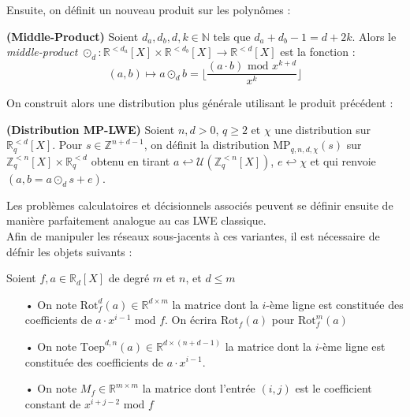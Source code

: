 \documentclass[11pt,a4paper]{article}
\begin{document}
Ensuite, on définit un nouveau produit sur les polynômes : 
\begin{defin}\textbf{(Middle-Product)}
Soient $d_a,d_b,d,k \in \mathbb{N}$ tels que $d_a+d_b-1=d+2k$. Alors le \textit{middle-product} $\odot_d : \mathbb{R}^{<d_a}[X]\times\mathbb{R}^{<d_b}[X]\to\mathbb{R}^{<d}[X]$ est la fonction :
\[(a,b) \mapsto a \odot_d b = \lfloor \frac{(a\cdot b)\text{ mod }x^{k+d}}{x^k} \rfloor\]
\end{defin}

On construit alors une distribution plus générale utilisant le produit précédent : 
\begin{defin}\textbf{(Distribution MP-LWE)}
Soient $n,d >0$, $q\geq 2$ et $\chi$ une distribution sur $\mathbb{R}_q^{<d}[X]$. Pour $s\in \mathbb{Z}^{n+d-1}$, on définit la distribution $\text{MP}_{q,n,d,\chi}(s)$ sur $\mathbb{Z}_q^{<n}[X]\times\mathbb{R}_q^{<d}$ obtenu en tirant $a \hookleftarrow \mathcal{U}(\mathbb{Z}_q^{<n}[X])$, $e\hookleftarrow \chi$ et qui renvoie $(a,b=a\odot_d s+e)$.
\end{defin}

Les problèmes calculatoires et décisionnels associés peuvent se définir ensuite de manière parfaitement analogue au cas LWE classique. \\

Afin de manipuler les réseaux sous-jacents à ces variantes, il est nécessaire de défnir les objets suivants : 

\begin{defin} Soient $f,a\in \mathbb{R}_d[X]$ de degré $m$ et $n$, et $d\leq m$
\begin{enumerate}
\item[•] On note $\text{Rot}^d_f(a) \in \mathbb{R}^{d\times m}$ la matrice dont la $i$-ème ligne est constituée des coefficients de $a\cdot x^{i-1}\text{ mod } f$. On écrira $\text{Rot}_f(a)$ pour  $\text{Rot}^m_f(a)$
\item[•] On note $\text{Toep}^{d,n}(a) \in \mathbb{R}^{d\times(n+d-1)}$ la matrice dont la $i$-ème ligne est constituée des coefficients de $a\cdot x^{i-1}$.
\item[•] On note $M_f \in \mathbb{R}^{m\times m}$ la matrice dont l'entrée $(i,j)$ est le coefficient constant de $x^{i+j-2}\text{ mod }f$
\end{enumerate}
\end{defin}
\end{document}
